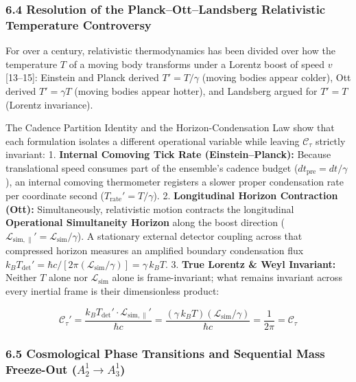 \documentclass[
]{article}
\begin{document}
\subsubsection{6.4 Resolution of the Planck--Ott--Landsberg Relativistic
Temperature
Controversy}\label{resolution-of-the-planckottlandsberg-relativistic-temperature-controversy}

For over a century, relativistic thermodynamics has been divided over
how the temperature \(T\) of a moving body transforms under a Lorentz
boost of speed \(v\) {[}13--15{]}: Einstein and Planck derived
\(T' = T/\gamma\) (moving bodies appear colder), Ott derived
\(T' = \gamma T\) (moving bodies appear hotter), and Landsberg argued
for \(T' = T\) (Lorentz invariance).

The Cadence Partition Identity and the Horizon-Condensation Law show
that each formulation isolates a different operational variable while
leaving \(\mathcal{C}_\tau\) strictly invariant: 1. \textbf{Internal
Comoving Tick Rate (Einstein--Planck):} Because translational speed
consumes part of the ensemble's cadence budget
(\(dt_{\mathrm{pre}} = dt/\gamma\)), an internal comoving thermometer
registers a slower proper condensation rate per coordinate second
(\(T_{\mathrm{rate}}' = T/\gamma\)). 2. \textbf{Longitudinal Horizon
Contraction (Ott):} Simultaneously, relativistic motion contracts the
longitudinal \textbf{Operational Simultaneity Horizon} along the boost
direction
(\(\mathcal{L}_{\mathrm{sim},\parallel}' = \mathcal{L}_{\mathrm{sim}}/\gamma\)).
A stationary external detector coupling across that compressed horizon
measures an amplified boundary condensation flux
\(k_B T_{\mathrm{det}}' = \hbar c / [2\pi(\mathcal{L}_{\mathrm{sim}}/\gamma)] = \gamma\,k_B T\).
3. \textbf{True Lorentz \& Weyl Invariant:} Neither \(T\) alone nor
\(\mathcal{L}_{\mathrm{sim}}\) alone is frame-invariant; what remains
invariant across every inertial frame is their dimensionless product:

\[\mathcal{C}_\tau' = \frac{k_B T_{\mathrm{det}}' \cdot \mathcal{L}_{\mathrm{sim},\parallel}'}{\hbar c} = \frac{(\gamma\,k_B T)(\mathcal{L}_{\mathrm{sim}}/\gamma)}{\hbar c} = \frac{1}{2\pi} = \mathcal{C}_\tau\]

\subsubsection{\texorpdfstring{6.5 Cosmological Phase Transitions and
Sequential Mass Freeze-Out
(\(A_2^1 \to A_3^1\))}{6.5 Cosmological Phase Transitions and Sequential Mass Freeze-Out (A\_2\^{}1 \textbackslash to A\_3\^{}1)}}\label{cosmological-phase-transitions-and-sequential-mass-freeze-out-a_21-to-a_31}
\end{document}
